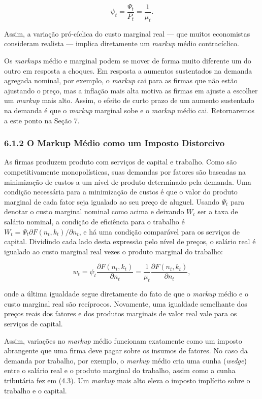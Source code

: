 \documentclass[12pt]{article}
\begin{document}
\begin{equation}
\psi_t = \frac{\Psi_t}{P_t} = \frac{1}{\mu_t}. \tag{6.3}
\end{equation}

Assim, a variação pró-cíclica do custo marginal real — que muitos economistas consideram realista — implica diretamente um \textit{markup} médio contracíclico.

Os \textit{markups} médio e marginal podem se mover de forma muito diferente um do outro em resposta a choques. Em resposta a aumentos sustentados na demanda agregada nominal, por exemplo, o \textit{markup} cai para as firmas que não estão ajustando o preço, mas a inflação mais alta motiva as firmas em ajuste a escolher um \textit{markup} mais alto. Assim, o efeito de curto prazo de um aumento sustentado na demanda é que o \textit{markup} marginal sobe e o \textit{markup} médio cai. Retornaremos a este ponto na Seção 7.

\subsubsection{6.1.2 O Markup Médio como um Imposto Distorcivo} As firmas produzem produto com serviços de capital e trabalho. Como são competitivamente monopolísticas, suas demandas por fatores são baseadas na minimização de custos a um nível de produto determinado pela demanda. Uma condição necessária para a minimização de custos é que o valor do produto marginal de cada fator seja igualado ao seu preço de aluguel. Usando $\Psi_t$ para denotar o custo marginal nominal como acima e deixando $W_t$ ser a taxa de salário nominal, a condição de eficiência para o trabalho é $W_t = \Psi_t \partial F(n_t, k_t)/\partial n_t$, e há uma condição comparável para os serviços de capital. Dividindo cada lado desta expressão pelo nível de preços, o salário real é igualado ao custo marginal real vezes o produto marginal do trabalho:

\begin{equation}
w_t = \psi_t \frac{\partial F(n_t, k_t)}{\partial n_t} = \frac{1}{\mu_t} \frac{\partial F(n_t, k_t)}{\partial n_t}, \tag{6.4}
\end{equation}

onde a última igualdade segue diretamente do fato de que o \textit{markup} médio e o custo marginal real são recíprocos. Novamente, uma igualdade semelhante dos preços reais dos fatores e dos produtos marginais de valor real vale para os serviços de capital.

Assim, variações no \textit{markup} médio funcionam exatamente como um imposto abrangente que uma firma deve pagar sobre os insumos de fatores. No caso da demanda por trabalho, por exemplo, o \textit{markup} médio cria uma cunha (\textit{wedge}) entre o salário real e o produto marginal do trabalho, assim como a cunha tributária fez em (4.3). Um \textit{markup} mais alto eleva o imposto implícito sobre o trabalho e o capital.
\end{document}
